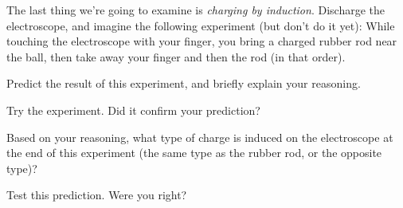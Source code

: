 \documentclass{article}
\begin{document}
\vskip 1in

The last thing we're going to examine is \textit{charging by induction}.
Discharge the electroscope, and imagine the following experiment (but don't do it yet):
While touching the electroscope
with your finger, you bring a charged rubber rod near the ball, then
take away your finger and then the rod (in that order).

Predict the result of this experiment, and briefly explain your reasoning.

\vskip 2in

Try the experiment. Did it confirm your prediction?

\vskip 1in

Based on your reasoning, what type of charge is induced on the electroscope
at the end of this experiment (the same type as the rubber rod,
or the opposite type)?

\vskip 1in

Test this prediction. Were you right?
\end{document}
